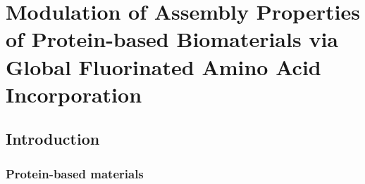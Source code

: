 \chapter{Modulation of Assembly Properties of Protein-based Biomaterials via
Global Fluorinated Amino Acid Incorporation}
\label{chap:pff}

\begin{refsection}

\section{Introduction}

\subsection{Protein-based materials}



\end{refsection}

